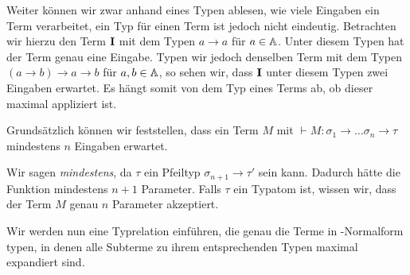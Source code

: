 Weiter können wir zwar anhand eines Typen ablesen, wie viele Eingaben ein Term verarbeitet, ein Typ für einen Term ist jedoch nicht eindeutig. Betrachten wir hierzu den Term $\textbf{I}$ mit dem Typen $a \to a$ für $a\in\mathbb{A}$. Unter diesem Typen hat der Term genau eine Eingabe. Typen wir jedoch denselben Term mit dem Typen $(a\to b)\to a\to b$ für $a,b\in\mathbb{A}$, so sehen wir, dass $\textbf{I}$ unter diesem Typen zwei Eingaben erwartet. Es hängt somit von dem Typ eines Terms ab, ob dieser maximal appliziert ist.

Grundsätzlich können wir feststellen, dass ein Term $M$ mit $\vdash M:\sigma_1\to\ldots\sigma_n\to \tau$ mindestens $n$ Eingaben erwartet.
\begin{remark}
    Wir sagen \emph{mindestens}, da $\tau$ ein Pfeiltyp $\sigma_{n+1}\to\tau'$ sein kann. Dadurch hätte die Funktion mindestens $n+1$ Parameter. Falls $\tau$ ein Typatom ist, wissen wir, dass der Term $M$ genau $n$ Parameter akzeptiert.
\end{remark}

Wir werden nun eine Typrelation einführen, die genau die Terme in \tbeta-Normalform typen, in denen alle Subterme zu ihrem entsprechenden Typen maximal expandiert sind.

